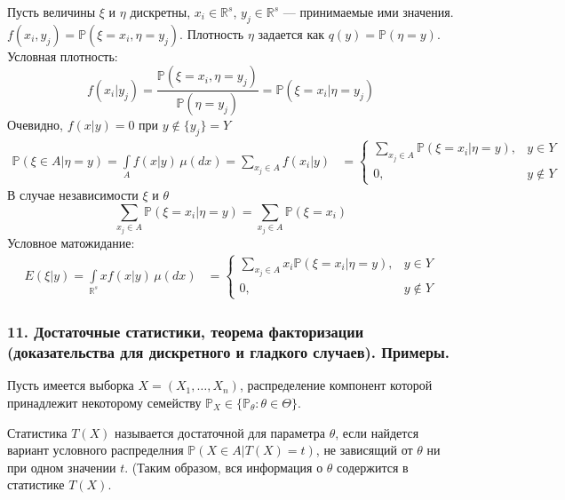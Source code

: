 \documentclass[12pt, russian]{article}
\begin{document}
Пусть величины $\xi$ и $\eta$ дискретны, $x_i\in\mathbb{R}^s$, $y_j\in\mathbb{R}^s$ --- принимаемые ими значения. $f(x_i, y_j) = \mathbb{P}(\xi = x_i, \eta = y_j)$. Плотность $\eta$ задается как $q(y) = \mathbb{P}(\eta = y)$. Условная плотность:
$$ f(x_i|y_j) = \frac{\mathbb{P}(\xi = x_i, \eta = y_j)}{\mathbb{P}(\eta = y_j)} = \mathbb{P}(\xi = x_i|\eta = y_j)$$
Очевидно, $f(x|y) = 0$ при $y\not\in \{y_j\} = Y$
\begin{equation*}
\begin{split}
\mathbb{P}(\xi\in A|\eta = y) = \int\limits_A{f(x|y)\,\mu(dx)} = \sum\limits_{x_j\in A}{f(x_i|y)}
&=\left\{
        \begin{array}{ll}
          \sum\limits_{x_j\in A}{\mathbb{P}(\xi = x_i|\eta = y)}, & y\in Y \\
          0, & y \not\in Y
        \end{array}
      \right.
\end{split}
\end{equation*} 
В случае независимости $\xi$ и $\theta$
$$ \sum\limits_{x_j\in A}{\mathbb{P}(\xi = x_i|\eta = y)} = \sum\limits_{x_j\in A}{\mathbb{P}(\xi = x_i)} $$
Условное матожидание:
\begin{equation*}
\begin{split}
E(\xi|y) = \int\limits_{\mathbb{R}^s}{xf(x|y)\,\mu(dx)}
&=\left\{
        \begin{array}{ll}
          \sum\limits_{x_j\in A}{x_i \mathbb{P}(\xi = x_i|\eta = y)}, & y\in Y \\
          0, & y \not\in Y
        \end{array}
      \right.
\end{split}
\end{equation*}

\newpage
\subsubsection*{11. Достаточные статистики, теорема факторизации (доказательства для дискретного и гладкого случаев). Примеры.}

Пусть имеется выборка $X = (X_1,\ldots,X_n)$, распределение компонент которой принадлежит некоторому семейству $\mathbb{P}_X \in \{ \mathbb{P}_\theta: \theta \in \Theta \}$.

\begin{mydef}
Статистика $T(X)$ называется достаточной для параметра $\theta$, если найдется вариант условного распределния $\mathbb{P}(X\in A|T(X) = t)$, не зависящий от $\theta$ ни при одном значении $t$.
(Таким образом, вся информация о $\theta$ содержится в статистике $T(X)$.
\end{mydef}
\end{document}
